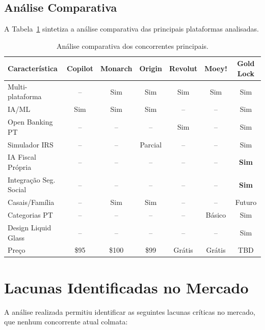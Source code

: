 \subsection{Análise Comparativa}

A Tabela~\ref{tab:comparativa} sintetiza a análise comparativa das principais plataformas analisadas.

\begin{table}[H]
\centering
\caption{Análise comparativa dos concorrentes principais.}
\label{tab:comparativa}
\small
\begin{tabularx}{\textwidth}{l c c c c c c}
\toprule
\textbf{Característica} & \textbf{Copilot} & \textbf{Monarch} & \textbf{Origin} & \textbf{Revolut} & \textbf{Moey!} & \textbf{Gold Lock} \\
\midrule
Multi-plataforma         & --  & Sim & Sim & Sim & Sim & Sim \\
IA/ML                    & Sim & Sim & Sim & --  & --  & Sim \\
Open Banking PT          & --  & --  & --  & Sim & --  & Sim \\
Simulador IRS            & --  & --  & Parcial & -- & -- & Sim \\
IA Fiscal Própria        & --  & --  & --  & --  & --  & \textbf{Sim} \\
Integração Seg. Social   & --  & --  & --  & --  & --  & \textbf{Sim} \\
Casais/Família           & --  & Sim & Sim & --  & --  & Futuro \\
Categorias PT            & --  & --  & --  & --  & Básico & Sim \\
Design Liquid Glass      & --  & --  & --  & --  & --  & Sim \\
Preço                    & \$95 & \$100 & \$99 & Grátis & Grátis & TBD \\
\bottomrule
\end{tabularx}
\end{table}


\section{Lacunas Identificadas no Mercado}
\label{sec:ea-lacunas}

A análise realizada permitiu identificar as seguintes lacunas críticas no mercado, que nenhum concorrente atual colmata:

